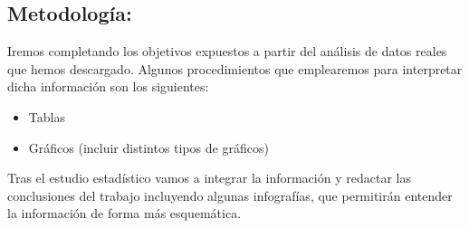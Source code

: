 \documentclass[
]{article}
\begin{document}
\hypertarget{metodologuxeda}{%
\subsection{Metodología:}\label{metodologuxeda}}

Iremos completando los objetivos expuestos a partir del análisis de
datos reales que hemos descargado. Algunos procedimientos que
emplearemos para interpretar dicha información son los siguientes:

\begin{itemize}
\item
  Tablas
\item
  Gráficos (incluir distintos tipos de gráficos)
\end{itemize}

Tras el estudio estadístico vamos a integrar la información y redactar
las conclusiones del trabajo incluyendo algunas infografías, que
permitirán entender la información de forma más esquemática.
\end{document}
